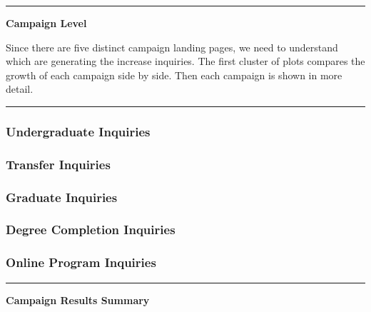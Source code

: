 \documentclass[]{tufte-handout}
\begin{document}
\begin{center}\rule{0.5\linewidth}{\linethickness}\end{center}

\textbf{Campaign Level}

Since there are five distinct campaign landing pages, we need to
understand which are generating the increase inquiries. The first
cluster of plots compares the growth of each campaign side by side. Then
each campaign is shown in more detail.

\begin{center}\rule{0.5\linewidth}{\linethickness}\end{center}

\hypertarget{undergraduate-inquiries}{%
\subsubsection{Undergraduate Inquiries}\label{undergraduate-inquiries}}

\hypertarget{transfer-inquiries}{%
\subsubsection{Transfer Inquiries}\label{transfer-inquiries}}

\hypertarget{graduate-inquiries}{%
\subsubsection{Graduate Inquiries}\label{graduate-inquiries}}

\hypertarget{degree-completion-inquiries}{%
\subsubsection{Degree Completion
Inquiries}\label{degree-completion-inquiries}}

\hypertarget{online-program-inquiries}{%
\subsubsection{Online Program
Inquiries}\label{online-program-inquiries}}

\begin{center}\rule{0.5\linewidth}{\linethickness}\end{center}

\textbf{Campaign Results Summary}
\end{document}
